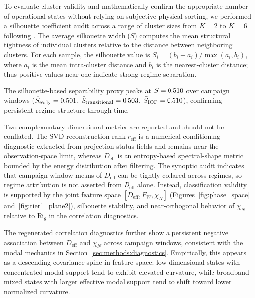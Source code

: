 To evaluate cluster validity and mathematically confirm the appropriate number of operational states without relying on subjective physical sorting, we performed a silhouette coefficient audit across a range of cluster sizes from $K=2$ to $K=6$ following \citet{Rousseeuw1987}. The average silhouette width ($\bar{S}$) computes the mean structural tightness of individual clusters relative to the distance between neighboring clusters. For each sample, the silhouette value is $S_i = (b_i-a_i)/\max(a_i,b_i)$, where $a_i$ is the mean intra-cluster distance and $b_i$ is the nearest-cluster distance; thus positive values near one indicate strong regime separation.

The silhouette-based separability proxy peaks at $\bar{S} = 0.510$ over campaign windows ($\bar{S}_{\mathrm{early}} = 0.501$, $\bar{S}_{\mathrm{transitional}} = 0.503$, $\bar{S}_{\mathrm{IOP}} = 0.510$), confirming persistent regime structure through time.

Two complementary dimensional metrics are reported and should not be conflated. The SVD reconstruction rank $r_{\mathrm{eff}}$ is a numerical conditioning diagnostic extracted from projection status fields and remains near the observation-space limit, whereas $D_{\mathrm{eff}}$ is an entropy-based spectral-shape metric bounded by the energy distribution after filtering. The synoptic audit indicates that campaign-window means of $D_{\mathrm{eff}}$ can be tightly collared across regimes, so regime attribution is not asserted from $D_{\mathrm{eff}}$ alone. Instead, classification validity is supported by the joint feature space $[D_{\mathrm{eff}}, F_W, \chi_N]$ (Figures~\ref{fig:phase_space} and~\ref{fig:tier1_plane2}), silhouette stability, and near-orthogonal behavior of $\chi_N$ relative to $\mathrm{Ri}_g$ in the correlation diagnostics.

The regenerated correlation diagnostics further show a persistent negative association between $D_{\mathrm{eff}}$ and $\chi_N$ across campaign windows, consistent with the modal mechanics in Section~\ref{sec:methods:diagnostics}. Empirically, this appears as a descending covariance spine in feature space: low-dimensional states with concentrated modal support tend to exhibit elevated curvature, while broadband mixed states with larger effective modal support tend to shift toward lower normalized curvature.


